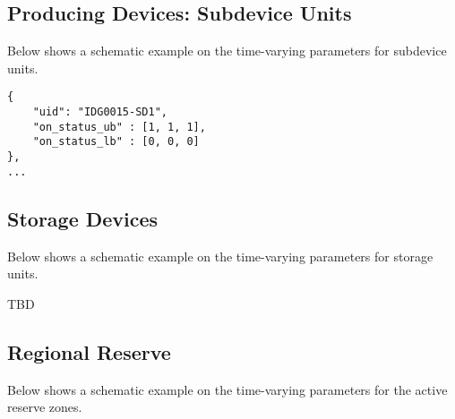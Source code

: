 \subsection{Producing Devices: Subdevice Units}
\label{sec:subdevice_time}
Below shows a schematic example on the time-varying parameters for subdevice units.
\begin{verbatim}
{
    "uid": "IDG0015-SD1",
    "on_status_ub" : [1, 1, 1],
    "on_status_lb" : [0, 0, 0]
}, 
... 
\end{verbatim}

\subsection{Storage Devices}
\label{sec:storage_time}
Below shows a schematic example on the time-varying parameters for storage units.
\begin{todo}[]{}
TBD 
\end{todo}

\subsection{Regional Reserve}
\label{sec:reserve_time}
Below shows a schematic example on the time-varying parameters for the active reserve zones. 


